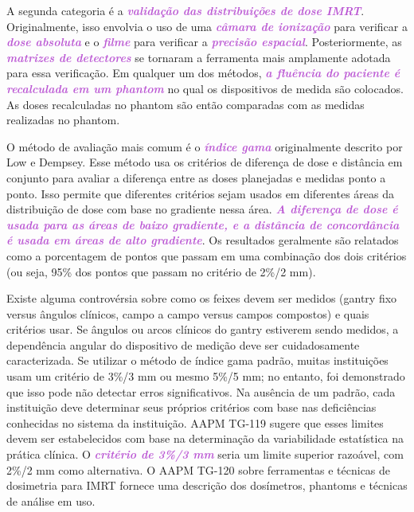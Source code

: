 \documentclass[11pt,a4paper]{article}
\begin{document}
	A segunda categoria é a \textcolor{MediumOrchid}{\textbf{\textit{validação das distribuições de dose IMRT}}}. Originalmente, isso envolvia o uso de uma \textcolor{MediumOrchid}{\textbf{\textit{câmara de ionização}}} para verificar a \textcolor{MediumOrchid}{\textbf{\textit{dose absoluta}}} e o \textcolor{MediumOrchid}{\textbf{\textit{filme}}} para verificar a \textcolor{MediumOrchid}{\textbf{\textit{precisão espacial}}}. Posteriormente, as \textcolor{MediumOrchid}{\textbf{\textit{matrizes de detectores}}} se tornaram a ferramenta mais amplamente adotada para essa verificação. Em qualquer um dos métodos, \textcolor{MediumOrchid}{\textbf{\textit{a fluência do paciente é recalculada em um phantom}}} no qual os dispositivos de medida são colocados. As doses recalculadas no phantom são então comparadas com as medidas realizadas no phantom.

	O método de avaliação mais comum é o \textcolor{MediumOrchid}{\textbf{\textit{índice gama}}} originalmente descrito por Low e Dempsey. Esse método usa os critérios de diferença de dose e distância em conjunto para avaliar a diferença entre as doses planejadas e medidas ponto a ponto. Isso permite que diferentes critérios sejam usados em diferentes áreas da distribuição de dose com base no gradiente nessa área. \textcolor{MediumOrchid}{\textbf{\textit{A diferença de dose é usada para as áreas de baixo gradiente, e a distância de concordância é usada em áreas de alto gradiente}}}. Os resultados geralmente são relatados como a porcentagem de pontos que passam em uma combinação dos dois critérios (ou seja, 95\% dos pontos que passam no critério de 2\%/2 mm). 
	
	Existe alguma controvérsia sobre como os feixes devem ser medidos (gantry fixo versus ângulos clínicos, campo a campo versus campos compostos) e quais critérios usar. Se ângulos ou arcos clínicos do gantry estiverem sendo medidos, a dependência angular do dispositivo de medição deve ser cuidadosamente caracterizada. Se utilizar o método de índice gama padrão, muitas instituições usam um critério de 3\%/3 mm ou mesmo 5\%/5 mm; no entanto, foi demonstrado que isso pode não detectar erros significativos. Na ausência de um padrão, cada instituição deve determinar seus próprios critérios com base nas deficiências conhecidas no sistema da instituição. AAPM TG-119 sugere que esses limites devem ser estabelecidos com base na determinação da variabilidade estatística na prática clínica. O \textcolor{MediumOrchid}{\textbf{\textit{critério de 3\%/3 mm}}} seria um limite superior razoável, com 2\%/2 mm como alternativa. O AAPM TG-120 sobre ferramentas e técnicas de dosimetria para IMRT fornece uma descrição dos dosímetros, phantoms e técnicas de análise em uso. 
	
\end{document}
